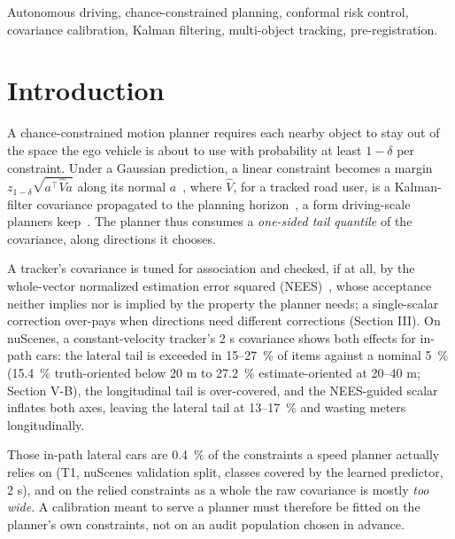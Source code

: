 \documentclass{ieeeaccess}
\begin{document}
\begin{keywords}
Autonomous driving, chance-constrained planning, conformal risk control, covariance calibration, Kalman filtering, multi-object tracking, pre-registration.
\end{keywords}

\titlepgskip=-21pt

\maketitle

\section{Introduction}
\label{sec:introduction}
A chance-constrained motion planner requires each nearby object to stay out of the space the ego vehicle is about to use with probability at least $1 - \delta$ per constraint. Under a Gaussian prediction, a linear constraint becomes a margin $z_{1-\delta}\sqrt{a^{\top}\hat{V}a}$ along its normal $a$~\cite{Blackmore2011,Ono2008}, where $\hat{V}$, for a tracked road user, is a Kalman-filter covariance propagated to the planning horizon~\cite{Zhu2019}, a form driving-scale planners keep~\cite{Nair2025,Ren2025}. The planner thus consumes a \emph{one-sided tail quantile} of the covariance, along directions it chooses.

A tracker's covariance is tuned for association and checked, if at all, by the whole-vector normalized estimation error squared (NEES)~\cite{BarShalom2001,Osterburg2026}, whose acceptance neither implies nor is implied by the property the planner needs; a single-scalar correction over-pays when directions need different corrections (Section III). On nuScenes, a constant-velocity tracker's 2 s covariance shows both effects for in-path cars: the lateral tail is exceeded in 15--27~\% of items against a nominal 5~\% (15.4~\% truth-oriented below 20 m to 27.2~\% estimate-oriented at 20--40 m; Section V-B), the longitudinal tail is over-covered, and the NEES-guided scalar inflates both axes, leaving the lateral tail at 13--17~\% and wasting meters longitudinally.

Those in-path lateral cars are 0.4~\% of the constraints a speed planner actually relies on (T1, nuScenes validation split, classes covered by the learned predictor, 2 s), and on the relied constraints as a whole the raw covariance is mostly \emph{too wide}. A calibration meant to serve a planner must therefore be fitted on the planner's own constraints, not on an audit population chosen in advance.
\end{document}
